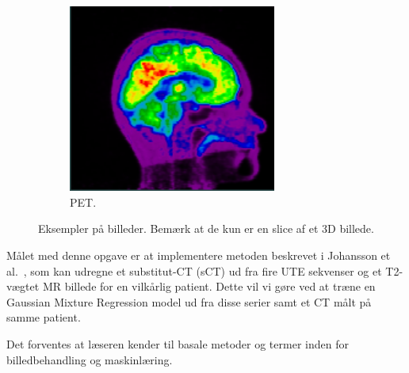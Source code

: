 \begin{figure}
\begin{subfigure}{0.3\textwidth}
        \includegraphics[width=0.75\textwidth]{billeder/pet.png}
        \caption{PET.}
        \label{eksempel:pet}
    \end{subfigure}\hfill
    \caption{Eksempler på billeder. Bemærk at de kun er en slice af et 3D billede.}
    \label{eksempel}
\end{figure}


Målet med denne opgave er at implementere metoden beskrevet i
Johansson et al.~\cite{johansson}, som kan udregne et substitut-CT (sCT)
ud fra fire UTE sekvenser og et T2-vægtet MR billede for en vilkårlig
patient. Dette vil vi gøre ved at træne en Gaussian Mixture Regression
model ud fra disse serier samt et CT målt på samme patient.

Det forventes at læseren kender til basale metoder og termer inden for
billedbehandling og maskinlæring.
